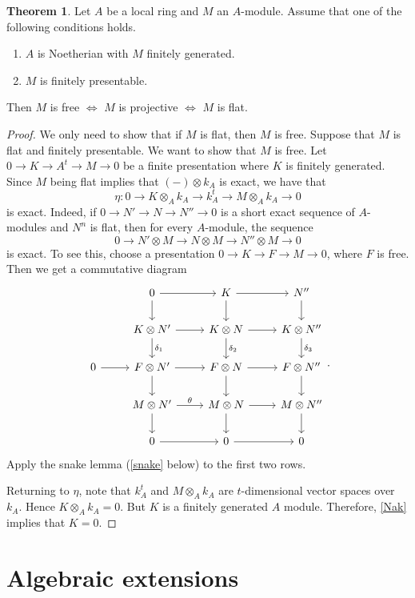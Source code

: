 \documentclass[10pt,letterpaper,cm]{nupset}
\theoremstyle{definition}
\theoremstyle{theorem}
\newtheorem{theorem}[definition]{Theorem}
\theoremstyle{remark}
\newcommand{\1}{\mathbf{1}}
\newcommand{\0}{\vec 0}
\begin{document}
\begin{theorem}
Let $A$ be a local ring and $M$ an $A$-module. Assume that one of the following conditions holds.
\begin{enumerate}[label=(\alph*)]
\item $A$ is Noetherian with $M$ finitely generated.
\item $M$ is finitely presentable.
\end{enumerate}
Then $M$ is free $\iff$ $M$ is projective $\iff$ $M$ is flat.
\end{theorem}
\begin{proof}
We only need to show that if $M$ is flat, then $M$ is free. Suppose that $M$ is flat and finitely presentable. We want to show that $M$ is free. Let $0 \to K \to A^t \to M \to 0$ be a finite presentation  where $K$ is finitely generated. Since $M$ being flat implies that $(-) \otimes k_A$ is exact, we have that $$\eta : 0 \to K \otimes_A k_A \to k_A^t \to M \otimes_A k_A \to 0$$ is exact. Indeed, if $0 \to N' \to N \to N'' \to 0$ is a short exact sequence of $A$-modules and $N^n$ is flat, then for every $A$-module, the sequence $$0 \to N' \otimes M \to N \otimes M \to N'' \otimes M \to 0$$ is exact. To see this, choose a presentation $0 \to K \to F \to M \to 0$, where $F$ is free. Then we get a commutative diagram
\[
\begin{tikzcd}
 & 0 \arrow[r] \arrow[d] & K \arrow[r] \arrow[d] & N'' \arrow[d] \\
 & K \otimes N' \arrow[r] \arrow[d, "\delta_1"] & K \otimes N \arrow[r] \arrow[d, "\delta_2"] & K \otimes N'' \arrow[d, "\delta_3"] \\
0 \arrow[r] & F \otimes N' \arrow[r] \arrow[d] & F \otimes N \arrow[r] \arrow[d] & F \otimes N'' \arrow[d] \\
 & M \otimes N' \arrow[r, "\theta"] \arrow[d] & M \otimes N \arrow[r] \arrow[d] & M \otimes N'' \arrow[d] \\
 & 0 \arrow[r] & 0 \arrow[r] & 0
\end{tikzcd}
.\]  Apply the snake lemma (\cref{snake} below) to the first two rows.  

Returning to $\eta$, note that $k_A^t$ and $M \otimes_A k_A$ are $t$-dimensional vector spaces over $k_A$. Hence $K \otimes_A k_A = 0$. But $K$ is a finitely generated $A$ module. Therefore, \cref{Nak} implies  that $K = 0$. 
\end{proof}

\section{Algebraic extensions}
\end{document}
